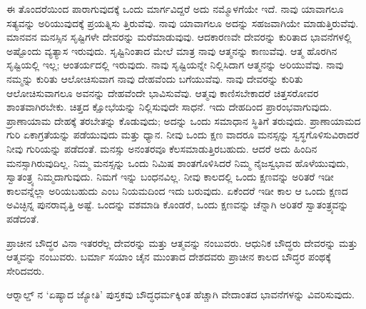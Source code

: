 ಈ ತೊಂದರೆಯಿಂದ ಪಾರಾಗುವುದಕ್ಕೆ ಒಂದು ಮಾರ್ಗವಿದ್ದರೆ ಅದು ನಮ್ಮೊಳಗೆಯೇ ಇದೆ. ನಾವು ಯಾವಾಗಲೂ ಸತ್ಯವನ್ನು ಅರಿಯುವುದಕ್ಕೆ ಪ್ರಯತ್ನಿಸು ತ್ತಿರುವೆವು. ನಾವು ಯಾವಾಗಲೂ ಅದನ್ನು ಸಹಜವಾಗಿಯೇ ಮಾಡುತ್ತಿರುವೆವು. ಮಾನವನ ಮನಸ್ಸಿನ ಸೃಷ್ಟಿಗಳೇ ದೇವರನ್ನು ಮರೆಮಾಡುವುವು. ಆದಕಾರಣವೇ ದೇವರನ್ನು ಕುರಿತಾದ ಭಾವನೆಗಳಲ್ಲಿ ಅಷ್ಟೊಂದು ವ್ಯತ್ಯಾಸ ಇರುವುದು. ಸೃಷ್ಟಿನಿಂತಾದ ಮೇಲೆ ಮಾತ್ರ ನಾವು ಆತ್ಮನನ್ನು ಕಾಣುವೆವು. ಆತ್ಮ ಹೊರಗಿನ ಸೃಷ್ಟಿಯಲ್ಲಿ ಇಲ್ಲ; ಆಂತರ್ಯದಲ್ಲಿ ಇರುವುದು. ನಾವು ಸೃಷ್ಟಿಯನ್ನೇ ನಿಲ್ಲಿಸಿದಾಗ ಆತ್ಮನನ್ನು ಅರಿಯುವೆವು. ನಾವು ನಮ್ಮನ್ನು ಕುರಿತು ಆಲೋಚಿಸುವಾಗ ನಾವು ದೇಹವೆಂದು ಬಗೆಯುವೆವು. ನಾವು ದೇವರನ್ನು ಕುರಿತು ಆಲೋಚಿಸುವಾಗಲೂ ಅವನನ್ನು ದೇಹವೆಂದೇ ಭಾವಿಸುವೆವು. ಆತ್ಮವು ಕಾಣಿಸಬೇಕಾದರೆ ಚಿತ್ತಸರೋವರ ಶಾಂತವಾಗಿರಬೇಕು. ಚಿತ್ತದ ಕ್ಷೋಭೆಯನ್ನು ನಿಲ್ಲಿಸುವುದೇ ಸಾಧನೆ. ಇದು ದೇಹದಿಂದ ಪ್ರಾರಂಭವಾಗುವುದು. ಪ್ರಾಣಾಯಾಮ ದೇಹಕ್ಕೆ ತರಬೇತನ್ನು ಕೊಡುವುದು; ಅದನ್ನು ಒಂದು ಸಮಾಧಾನ ಸ್ಥಿತಿಗೆ ತರುವುದು. ಪ್ರಾಣಾಯಾಮದ ಗುರಿ ಏಕಾಗ್ರತೆಯನ್ನು ಪಡೆಯುವುದು ಮತ್ತು ಧ್ಯಾನ. ನೀವು ಒಂದು ಕ್ಷಣ ವಾದರೂ ಮನಸ್ಸನ್ನು ಸ್ವಸ್ಥಗೊಳಿಸುವಿರಾದರೆ ನೀವು ಗುರಿಯನ್ನು ಪಡೆದಂತೆ. ಮನಸ್ಸು ಅನಂತರವೂ ಕೆಲಸಮಾಡುತ್ತಿರಬಹುದು. ಆದರೆ ಅದು ಹಿಂದಿನ ಮನಸ್ಸಾಗಿರುವುದಿಲ್ಲ. ನಿಮ್ಮ ಮನಸ್ಸನ್ನು ಒಂದು ನಿಮಿಷ ಶಾಂತಗೊಳಿಸಿದರೆ ನಿಮ್ಮ ನೈಜಸ್ವಭಾವ ಹೊಳೆಯುವುದು, ಸ್ವಾತಂತ್ರ್ಯ ನಿಮ್ಮದಾಗುವುದು. ನಿಮಗೆ ಇನ್ನು ಬಂಧನವಿಲ್ಲ. ನೀವು ಕಾಲದಲ್ಲಿ ಒಂದು ಕ್ಷಣವನ್ನು ಅರಿತರೆ ಇಡೀ ಕಾಲವನ್ನೆಲ್ಲಾ ಅರಿಯಬಹುದು ಎಂಬ ನಿಯಮದಿಂದ ಇದು ಬರುವುದು. ಏಕೆಂದರೆ ಇಡೀ ಕಾಲ ಆ ಒಂದು ಕ್ಷಣದ ಅವಿಚ್ಛಿನ್ನ ಪುನರಾವೃತ್ತಿ ಅಷ್ಟೆ. ಒಂದನ್ನು ವಶಮಾಡಿ ಕೊಂಡರೆ, ಒಂದು ಕ್ಷಣವನ್ನು ಚೆನ್ನಾಗಿ ಅರಿತರೆ ಸ್ವಾತಂತ್ರ್ಯವನ್ನು ಪಡೆದಂತೆ.

ಪ್ರಾಚೀನ ಬೌದ್ಧರ ವಿನಾ ಇತರರೆಲ್ಲ ದೇವರನ್ನು ಮತ್ತು ಆತ್ಮವನ್ನು ನಂಬುವರು. ಆಧುನಿಕ ಬೌದ್ಧರು ದೇವರನ್ನು ಮತ್ತು ಆತ್ಮವನ್ನು ನಂಬುವರು. ಬರ್ಮಾ ಸಯಾಂ ಚೈನ ಮುಂತಾದ ದೇಶದವರು ಪ್ರಾಚೀನ ಕಾಲದ ಬೌದ್ಧರ ಪಂಥಕ್ಕೆ ಸೇರಿದವರು.

ಆರ‌್ನಾ‌ಲ್ಡ್ ನ ‘ಏಷ್ಯಾದ ಜ್ಯೋತಿ’ ಪುಸ್ತಕವು ಬೌದ್ಧಧರ್ಮಕ್ಕಿಂತ ಹೆಚ್ಚಾಗಿ ವೇದಾಂತದ ಭಾವನೆಗಳನ್ನು ವಿವರಿಸುವುದು.

